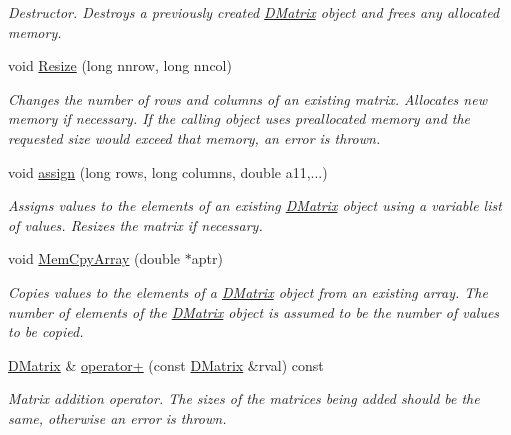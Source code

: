 \begin{DoxyCompactItemize}
\begin{DoxyCompactList}\small\item\em Destructor. Destroys a previously created \hyperlink{classDMatrix}{DMatrix} object and frees any allocated memory. \item\end{DoxyCompactList}\item 
void \hyperlink{classDMatrix_a523236d1477888fc53f74bbc00a30fa6}{Resize} (long nnrow, long nncol)
\begin{DoxyCompactList}\small\item\em Changes the number of rows and columns of an existing matrix. Allocates new memory if necessary. If the calling object uses preallocated memory and the requested size would exceed that memory, an error is thrown. \item\end{DoxyCompactList}\item 
void \hyperlink{classDMatrix_ab8c6ade7a8a3cfaae690572887575fdc}{assign} (long rows, long columns, double a11,...)
\begin{DoxyCompactList}\small\item\em Assigns values to the elements of an existing \hyperlink{classDMatrix}{DMatrix} object using a variable list of values. Resizes the matrix if necessary. \item\end{DoxyCompactList}\item 
void \hyperlink{classDMatrix_a0363c3677623145f180fe42d294c6ede}{MemCpyArray} (double $\ast$aptr)
\begin{DoxyCompactList}\small\item\em Copies values to the elements of a \hyperlink{classDMatrix}{DMatrix} object from an existing array. The number of elements of the \hyperlink{classDMatrix}{DMatrix} object is assumed to be the number of values to be copied. \item\end{DoxyCompactList}\item 
\hyperlink{classDMatrix}{DMatrix} \& \hyperlink{classDMatrix_ac87ec83dbff242d422e1cb369bd2ca88}{operator+} (const \hyperlink{classDMatrix}{DMatrix} \&rval) const 
\begin{DoxyCompactList}\small\item\em Matrix addition operator. The sizes of the matrices being added should be the same, otherwise an error is thrown. \item\end{DoxyCompactList}\item 

\end{DoxyCompactItemize}
